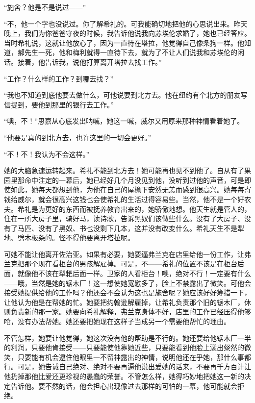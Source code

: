 \par “施舍？他是不是说过——”
\par “不，他一个字也没说过。你了解希礼的。可我能确切地把他的心思说出来。昨天晚上，我们为你爸爸守夜的时候，我告诉他说我向苏埃伦求婚了，她也已经答应。当时希礼说，这就让他放心了，因为一直待在塔拉，他觉得自己像条狗一样。他知道，郝先生一死，他和梅利就得一直待下去，就为了不让人们说我和苏埃伦的闲话。接着，他告诉我，说他打算离开塔拉去找工作。”
\par “工作？什么样的工作？到哪去找？”
\par “我也不知道到底他要去做什么，可他说要到北方去。他在纽约有个北方的朋友写信提到，要他到那里的银行去工作。”
\par “噢，不！”思嘉从心底发出呐喊，她这一喊，威尔又用原来那种神情看着她了。
\par “他要是真的到北方去，也许这里的一切会更好。”
\par “不！不！我认为不会这样。”
\par 她的大脑急速运转起来。希礼不能到北方去！她可能再也见不到他了。自从有了果园里那命中注定的一幕后，她已经好几个月没见到他，没听到过他的声音，可是即使如此，她每天都想到他，为他在自己的屋檐下安然无恙而感到很高兴。她每每寄钱给威尔，就会很高兴这钱也会使希礼的生活过得容易些。当然，他不是一个好农夫。希礼是为更好的东西而被抚养教育出来的，她骄傲地想。他天生就是管人的，住在一所大房子里，骑好马，读诗歌，告诉黑奴们该做些什么。没有了大房子、没有了马匹、没有了黑奴、书也没剩下几本，这并没有改变什么。希礼天生不是犁地、劈木板条的。怪不得他要离开塔拉呢。
\par 可她不能让他离开佐治亚。如果有必要，她要逼弗兰克在店里给他一份工作，让弗兰克把那个现在看柜台的男孩解雇掉。可是，不——希礼的位置不该是在柜台后面，就像他不该在犁耙后面一样。卫家的人看柜台！噢，绝对不行！一定要有什么——哦，当然是她的锯木厂！这一想使她宽慰多了，脸上不禁露出了微笑。可他会接受她提供给他的工作吗？他还会不会认为这也是施舍呢？她应该好好筹措一下，让他认为他是在帮她的忙。她要把约翰逊解雇掉，让希礼负责那个旧的锯木厂，休则负责新的那一家。她要向希礼解释，弗兰克身体不好，店里的工作已经压得他够呛，没有办法帮她。她还要把她现在这样子当成另一个需要他帮忙的理由。
\par 不管怎样，她要让他觉得，她这次没有他的帮助是不行的。她还要给他锯木厂一半的利润，只要他肯接受——只要能使他靠她近些，只要能看到他脸上漾出粲然的微笑，只要能有机会逮住他眼里一不留神露出的神情，说明他还在乎她，那什么事都行。可是，她告诫自己绝对、绝对不要再逼他说出爱她的话来，不要再千方百计让他扔掉那他比爱还更珍视的愚蠢的荣誉。不管怎么样，她得巧妙地把她这一新的决定告诉他。要不然的话，他会担心出现像过去那样的可怕的一幕，他可能就会拒绝。
